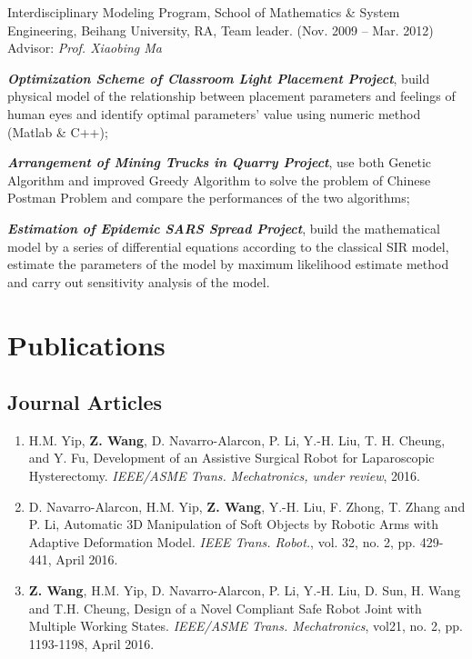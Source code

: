 \documentclass[10pt,letterpaper]{article}
\renewenvironment{itemize}{
  \begin{list}{}{
    \setlength{\leftmargin}{1.5em}
    \setlength{\itemsep}{0.25em}
    \setlength{\parskip}{0pt}
    \setlength{\parsep}{0.25em}
  }
}{
  \end{list}
}
\begin{document}
\begin{itemize}
  \item Interdisciplinary Modeling Program, School of Mathematics \& System Engineering, Beihang University, RA, Team leader. (Nov. 2009 -- Mar. 2012) \\
    Advisor: \textit{Prof. Xiaobing Ma}
  \begin{itemize}
    \item \textbf{\textit{Optimization Scheme of Classroom Light Placement Project}}, build physical model of the relationship between placement parameters and feelings of human eyes and identify optimal parameters' value using numeric method (Matlab \& C++);
    \item \textit{\textbf{Arrangement of Mining Trucks in Quarry Project}}, use both Genetic Algorithm and improved Greedy Algorithm to solve the problem of Chinese Postman Problem and compare the performances of the two algorithms;
    \item \textbf{\textit{Estimation of Epidemic SARS Spread Project}}, build the mathematical model by a series of differential equations according to the classical SIR model, estimate the parameters of the model by maximum likelihood estimate method and carry out sensitivity analysis of the model.
  \end{itemize}
\end{itemize}

\newpage
\section*{Publications}

\subsection*{Journal Articles}
\begin{enumerate}
\item H.M. Yip, \textbf{Z. Wang}, D. Navarro-Alarcon, P. Li, Y.-H. Liu, T. H. Cheung, and Y. Fu,
  Development of an Assistive Surgical Robot for Laparoscopic Hysterectomy.
  \textit{{IEEE/ASME} Trans. Mechatronics, under review}, 2016.
\item D. Navarro-Alarcon, H.M. Yip, \textbf{Z. Wang}, Y.-H. Liu, F. Zhong, T. Zhang and P. Li,
  Automatic 3D Manipulation of Soft Objects by Robotic Arms with Adaptive Deformation Model.
  \textit{{IEEE} Trans. Robot.}, vol. 32, no. 2, pp. 429-441, April 2016.
\item \textbf{Z. Wang}, H.M. Yip, D. Navarro-Alarcon, P. Li, Y.-H. Liu, D. Sun, H. Wang and T.H. Cheung,
  Design of a Novel Compliant Safe Robot Joint with Multiple Working States.
  \textit{{IEEE/ASME} Trans. Mechatronics}, vol21, no. 2, pp. 1193-1198, April 2016.
\end{enumerate}
\end{document}
